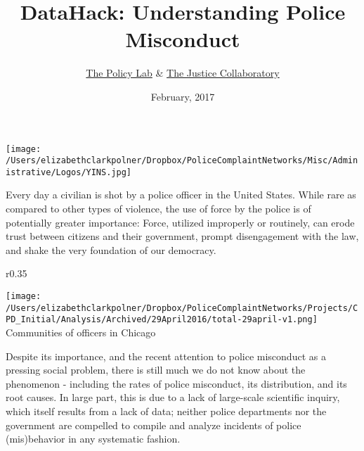 \documentclass[11pt]{amsart}
\title{DataHack: Understanding Police Misconduct}
\author{\href{http://isps.yale.edu/programs/policy-lab}{The Policy Lab} \& \href{https://www.law.yale.edu/centers-workshops/justice-collaboratory}{The Justice Collaboratory}}
\date{February, 2017}                                           %
\begin{document}
\begin{center}
\texttt{[image: /Users/elizabethclarkpolner/Dropbox/PoliceComplaintNetworks/Misc/Administrative/Logos/YINS.jpg]} \\
\end{center} 

\maketitle
Every day a civilian is shot by a police officer in the United States. While rare as compared to other types of violence, the use of force by the police is of potentially greater importance: Force, utilized improperly or routinely, can erode trust between citizens and their government, prompt disengagement with the law, and shake the very foundation of our democracy.  

\begin{wrapfigure}{r}{0.35\textwidth}
  \begin{center}
    \texttt{[image: /Users/elizabethclarkpolner/Dropbox/PoliceComplaintNetworks/Projects/CPD\_Initial/Analysis/Archived/29April2016/total-29april-v1.png]} \\
    \footnotesize{Communities of officers in Chicago}
  \end{center}
\end{wrapfigure}

Despite its importance, and the recent attention to police misconduct as a pressing social problem, there is still much we do not know about the phenomenon - including the rates of police misconduct, its distribution, and its root causes.  In large part, this is due to a lack of large-scale scientific inquiry, which itself results from a lack of data; neither police departments nor the government are compelled to compile and analyze incidents of police (mis)behavior in any systematic fashion. 
\end{document}
